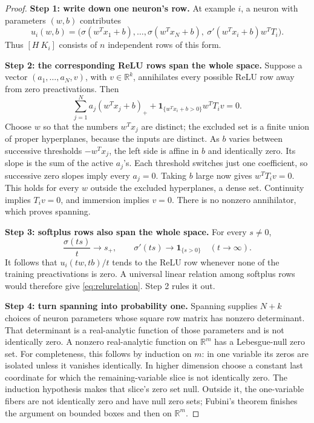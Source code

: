 \documentclass[12pt,a4paper]{article}
\theoremstyle{readable}
\theoremstyle{definition}\newtheorem{example}[theorem]{Example}
\newcommand{\R}{\mathbb R}\newcommand{\rank}{\operatorname{rank}}
\begin{document}
\begin{proof}
\textbf{Step 1: write down one neuron's row.} At example \(i\), a neuron with parameters \((w,b)\) contributes
\[
u_i(w,b)=\bigl(\sigma(w^Tx_1+b),\ldots,\sigma(w^Tx_N+b),
\ \sigma'(w^Tx_i+b)w^TT_i\bigr).
\]
Thus \([H\ K_i]\) consists of \(n\) independent rows of this form.

\textbf{Step 2: the corresponding ReLU rows span the whole space.} Suppose a vector \((a_1,\ldots,a_N,v)\), with \(v\in\R^k\), annihilates every possible ReLU row away from zero preactivations. Then
\begin{equation}\label{eq:relurelation}
\sum_{j=1}^N a_j(w^Tx_j+b)_+
+\mathbf1_{\{w^Tx_i+b>0\}}w^TT_iv=0.
\end{equation}
Choose \(w\) so that the numbers \(w^Tx_j\) are distinct; the excluded set is a finite union of proper hyperplanes, because the inputs are distinct. As \(b\) varies between successive thresholds \(-w^Tx_j\), the left side is affine in \(b\) and identically zero. Its slope is the sum of the active \(a_j\)'s. Each threshold switches just one coefficient, so successive zero slopes imply every \(a_j=0\). Taking \(b\) large now gives \(w^TT_iv=0\). This holds for every \(w\) outside the excluded hyperplanes, a dense set. Continuity implies \(T_iv=0\), and immersion implies \(v=0\). There is no nonzero annihilator, which proves spanning.

\textbf{Step 3: softplus rows also span the whole space.} For every \(s\ne0\),
\[
\frac{\sigma(ts)}t\longrightarrow s_+,
\qquad \sigma'(ts)\longrightarrow\mathbf1_{\{s>0\}}
\quad (t\to\infty).
\]
It follows that \(u_i(tw,tb)/t\) tends to the ReLU row whenever none of the training preactivations is zero. A universal linear relation among softplus rows would therefore give \eqref{eq:relurelation}. Step 2 rules it out.

\textbf{Step 4: turn spanning into probability one.} Spanning supplies \(N+k\) choices of neuron parameters whose square row matrix has nonzero determinant. That determinant is a real-analytic function of those parameters and is not identically zero. A nonzero real-analytic function on \(\R^m\) has a Lebesgue-null zero set. For completeness, this follows by induction on \(m\): in one variable its zeros are isolated unless it vanishes identically. In higher dimension choose a constant last coordinate for which the remaining-variable slice is not identically zero. The induction hypothesis makes that slice's zero set null. Outside it, the one-variable fibers are not identically zero and have null zero sets; Fubini's theorem finishes the argument on bounded boxes and then on \(\R^m\).


\end{proof}
\end{document}
